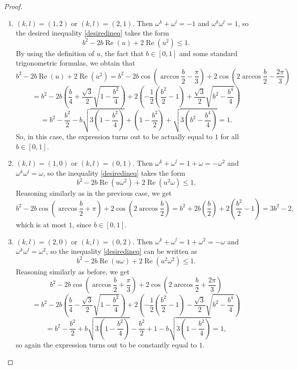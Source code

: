 \documentclass[10pt,a4paper]{amsart}
\DeclareMathOperator{\re}{Re}
\begin{document}
\begin{proof}
\begin{enumerate}
\item $(k, l)=(1, 2)$ or $(k, l) = (2, 1)$. Then $\omega^k + \omega^l=-1$ and $\omega^k \omega^l = 1$, so the desired inequality \eqref{desiredineq} takes the form
$$b^2 - 2b\re(u) + 2\re(u^2) \leq 1.$$
By using the definition of $u$, the fact that $b \in [0, 1]$ and some standard trigonometric formulas, we obtain that
$$b^2 - 2b\re(u) + 2\re(u^2) = b^2 - 2b \cos \left ( \arccos{\frac{b}{2}} - \frac{\pi}{3} \right ) + 2 \cos \left (2\arccos{\frac{b}{2}} - \frac{2\pi}{3} \right ) $$
$$=b^2 - 2b \left( \frac{b}{4} + \frac{\sqrt{3}}{2} \sqrt{1 - \frac{b^2}{4}} \right) + 2 \left( -\frac{1}{2} \left( \frac{b^2}{2} - 1 \right) + \frac{\sqrt{3}}{2} \sqrt{b^2 - \frac{b^4}{4}} \right)$$
$$=b^2 - \frac{b^2}{2} - b\sqrt{3\left ( 1 - \frac{b^2}{4} \right )} + \left ( 1 -\frac{b^2}{2} \right ) + \sqrt{3\left ( b^2 - \frac{b^4}{4} \right )} = 1.$$
So, in this case, the expression turns out to be actually equal to $1$ for all $b \in [0, 1]$.
\item $(k, l) = (1, 0)$ or $(k, l) = (0, 1)$. Then $\omega ^k + \omega^l = 1 + \omega = -\omega^2$ and $\omega^k \omega^l = \omega$, so the inequality \eqref{desiredineq} takes the form
$$b^2  - 2b \re \left (u \omega^2 \right ) + 2 \re \left (u^2\omega \right ) \leq 1.$$
Reasoning similarly as in the previous case, we get
$$b^2  - 2b \cos \left (\arccos{\frac{b}{2}} + \pi \right ) + 2 \cos \left (2\arccos{\frac{b}{2}} \right ) = b^2  + 2b \left ( \frac{b}{2} \right ) + 2 \left ( \frac{b^2}{2} - 1 \right ) = 3b^2 - 2,$$
which is at most $1$, since $b \in [0, 1]$.
\item $(k, l) = (2, 0)$ or $(k, l) = (0, 2)$. Then $\omega ^k + \omega^l = 1 + \omega^2 = -\omega$ and $\omega^k \omega^l = \omega^2$, so the inequality \eqref{desiredineq} can be written as
$$b^2  - 2b \re \left (u \omega \right ) + 2 \re \left (u^2\omega^2 \right ) \leq 1.$$
Reasoning similarly as before, we get
$$b^2  - 2b \cos \left (\arccos{\frac{b}{2}} + \frac{\pi}{3} \right ) + 2 \cos \left (2\arccos{\frac{b}{2}}+\frac{2\pi}{3} \right )$$
$$=b^2 - 2b \left( \frac{b}{4} - \frac{\sqrt{3}}{2} \sqrt{1 - \frac{b^2}{4}} \right) + 2 \left( -\frac{1}{2} \left( \frac{b^2}{2} - 1 \right) - \frac{\sqrt{3}}{2} \sqrt{b^2 - \frac{b^4}{4}} \right)$$
$$=b^2 - \frac{b^2}{2} + b\sqrt{3\left ( 1 - \frac{b^2}{4} \right )} - \frac{b^2}{2} + 1 - b\sqrt{3\left ( 1 - \frac{b^2}{4} \right )} = 1,$$
so again the expression turns out to be constantly equal to $1$. 


\end{enumerate}
\end{proof}
\end{document}
